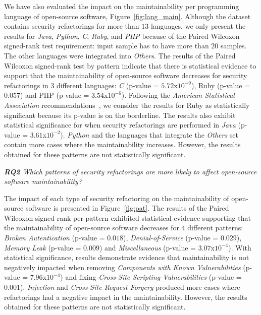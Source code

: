 \documentclass[sigconf,review]{acmart}
\begin{document}
We have also evaluated the impact on the maintainability per programming language
of open-source software, Figure~\ref{fig:lang_main}. Although
the dataset contains security refactorings for more than $13$ languages, we only
present the results for \emph{Java}, \emph{Python}, \emph{C}, \emph{Ruby}, and \emph{PHP}
because of the Paired Wilcoxon signed-rank test requirement: input sample has to have more 
than $20$ samples. The other languages were
integrated into \emph{Others}. The results of the Paired Wilcoxon signed-rank
test by pattern indicate that there is statistical evidence to support that the
maintainability of open-source software decreases for security refactorings in
$3$ different languages: \emph{C} (p-value = $5.72$x$10^{-9}$), Ruby (p-value = $0.057$) and
PHP (p-value = $3.54$x$10^{-6}$). Following the \textit{American Statistical Association} 
recommendations~\cite{doi:10.1080/00031305.2016.1154108}, we consider the results for 
Ruby as statistically significant because its p-value is on the borderline.
The results also exhibit statistical significance for when security refactorings 
are performed in \emph{Java} (p-value = $3.61$x$10^{-2}$). \emph{Python} and the 
languages that integrate the \emph{Others} set contain more cases where the 
maintainability increases. However, the results obtained for these patterns are 
not statistically significant.

\begin{framed}
\textit{\textbf{RQ2} Which patterns of security refactorings are more likely to
affect open-source software maintainability?}
\vspace{-0.1cm}
\end{framed}
\vspace{-0.1cm}

The impact of each type of security refactoring on the maintainability of
open-source software is presented in Figure~\ref{fig:pat}. The results of the
Paired Wilcoxon signed-rank per pattern exhibited statistical
evidence supporting that the maintainability of open-source software decreases
for $4$ different patterns: \emph{Broken Autentication} (p-value = $0.018$),
\emph{Denial-of-Service} (p-value = $0.029$), \emph{Memory Leak} (p-value = $0.009$) and
\emph{Miscellaneous} (p-value = $3.07$x$10^{-4}$). With statistical
significance, results demonstrate evidence that maintainability is not
negatively impacted when removing \emph{Components with Known Vulnerabilities}
(p-value = $7.96$x$10^{-4}$) and fixing \emph{Cross-Site Scripting
Vulnerabilities} (p-value = $0.001$). \emph{Injection} and \emph{Cross-Site
Request Forgery} produced more cases where refactorings had a negative
impact in the maintainability. However, the results obtained for these patterns
are not statistically significant.
\end{document}
